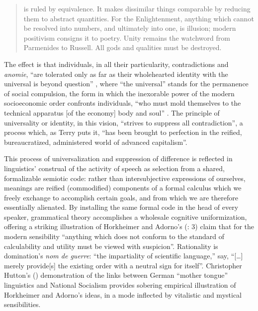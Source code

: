 \documentclass[output=paper]{langscibook}
\begin{document}
\begin{quotation}
is ruled by equivalence. It makes dissimilar things comparable by reducing them to abstract quantities. For the Enlightenment, anything which cannot be resolved into numbers, and ultimately into one, is illusion; modern positivism consigns it to poetry. Unity remains the watchword from Parmenides to Russell. All gods and qualities must be destroyed. \citep[4--5]{HorkheimerAdorno20021944}
\end{quotation}

\noindent The effect is that individuals, in all their particularity, contradictions and \emph{anomie}, ``are tolerated only as far as their wholehearted identity with the universal is beyond question'' \citep[124]{HorkheimerAdorno20021944}, where ``the universal'' stands for the permanence of social compulsion, the form in which the inexorable power of the modern socioeconomic order confronts individuals, ``who must mold themselves to the technical apparatus [of the economy] body and soul'' \citep[23]{HorkheimerAdorno20021944}. The principle of universality or identity, in this vision, ``strives to suppress all contradiction'', a process which, as Terry \citet[127]{Eagleton1991} puts it, ``has been brought to perfection in the reified, bureaucratized, administered world of advanced capitalism''.

This process of universalization and suppression of difference is reflected in linguistics' construal of the activity of speech as selection from a shared, formalizable semiotic code: rather than intersubjective expressions of ourselves, meanings are reified (commodified) components of a formal calculus which we freely exchange to accomplish certain goals, and from which we are therefore essentially alienated. By installing the same formal code in the head of every speaker, grammatical theory accomplishes a wholesale cognitive uniformization, offering a striking illustration of Horkheimer and Adorno's (\citeyear{HorkheimerAdorno20021944}: 3) claim that for the modern sensibility ``anything which does not conform to the standard of calculability and utility must be viewed with suspicion''. Rationality is domination's \emph{nom de guerre}: ``the impartiality of scientific language,'' \citet[17]{HorkheimerAdorno20021944} say, ``[…] merely provide[s] the existing order with a neutral sign for itself''.  Christopher Hutton’s (\citeyear{Hutton1999}) demonstration of the links between German ``mother tongue'' linguistics and National Socialism provides sobering empirical illustration of Horkheimer and Adorno's ideas, in a mode inflected by vitalistic and mystical sensibilities.
\end{document}
